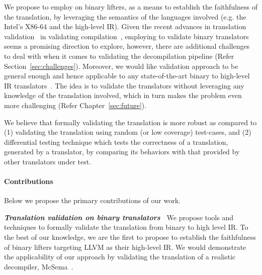 We propose to employ \tv on binary lifters, as a means to establish the
faithfulness of the translation, by leveraging the semantics of the languages
involved (e.g. the Intel's X86-64 and the high-level IR).  
Given the recent advances in translation validation~\cite{Pnueli:1998} in validating compilation~\cite{Necula:2000,Pnueli:1998,Stepp:2011,Tristan:2011,VOC2002,TVOC:CAV2005},
employing \tv to validate binary translators seems a promising direction to explore,
  however,
  there are additional challenges to deal with when it comes to validating the
  decompilation pipeline (Refer Section~\ref{sec:challenges}). Moreover, we
  would like validation approach to be general enough and hence applicable to
  any state-of-the-art binary to high-level IR
  translators~\cite{McSema:Recon14,Remill,FCD,llvm-mctoll,BAP:CAV11,Angr1,DiFederico:CC2017}.
  The idea is to validate the translators without leveraging any knowledge of the translation involved, which in turn makes the problem even more challenging (Refer Chapter~\ref{sec:future}).

We believe that formally validating the translation is more robust as compared
to (1) validating the translation using random (or low coverage) test-cases,
   and (2) differential testing technique which tests the correctness of a
   translation, generated by a translator, by comparing its behaviors with that
   provided by other translators under test. 

\paragraph{Contributions}
Below we propose the  primary contributions of our work.

\textbf{\emph{Translation validation on binary translators~}} We propose tools and
techniques to formally validate the translation from binary to high level IR.
To the best of our knowledge, we are the first to propose \tv to establish the
faithfulness of binary lifters targeting LLVM as their high-level IR. We would demonstrate the applicability of our approach by validating the translation of a realistic decompiler, McSema~\cite{McSema:Recon14}.

